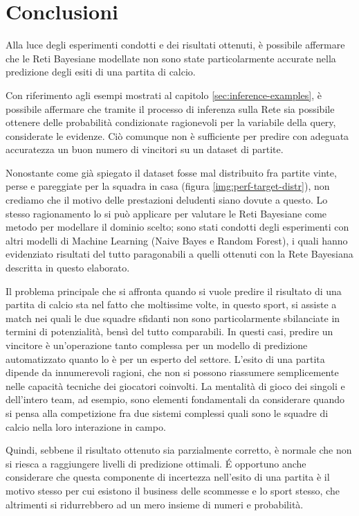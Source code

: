 \documentclass[hidelinks, 12pt]{article}
\begin{document}
\clearpage



\section{Conclusioni}

Alla luce degli esperimenti condotti e dei risultati ottenuti, è possibile affermare che le Reti Bayesiane modellate non sono state particolarmente accurate nella predizione degli esiti di una partita di calcio.

Con riferimento agli esempi mostrati al capitolo \ref{sec:inference-examples}, è possibile affermare che tramite il processo di inferenza sulla Rete sia possibile ottenere delle probabilità condizionate ragionevoli per la variabile della query, considerate le evidenze. Ciò comunque non è sufficiente per predire con adeguata accuratezza un buon numero di vincitori su un dataset di partite.

Nonostante come già spiegato il dataset fosse mal distribuito fra partite vinte, perse e pareggiate per la squadra in casa (figura \ref{img:perf-target-distr}), non crediamo che il motivo delle prestazioni deludenti siano dovute a questo. Lo stesso ragionamento lo si può applicare per valutare le Reti Bayesiane come metodo per modellare il dominio scelto; sono stati condotti degli esperimenti con altri modelli di Machine Learning (Naive Bayes e Random Forest), i quali hanno evidenziato risultati del tutto paragonabili a quelli ottenuti con la Rete Bayesiana descritta in questo elaborato.

Il problema principale che si affronta quando si vuole predire il risultato di una partita di calcio sta nel fatto che moltissime volte, in questo sport, si assiste a match nei quali le due squadre sfidanti non sono particolarmente sbilanciate in termini di potenzialità, bensì del tutto comparabili. In questi casi, predire un vincitore è un'operazione tanto complessa per un modello di predizione automatizzato quanto lo è per un esperto del settore. L'esito di una partita dipende da innumerevoli ragioni, che non si possono riassumere semplicemente nelle capacità tecniche dei giocatori coinvolti. La mentalità di gioco dei singoli e dell'intero team, ad esempio, sono elementi fondamentali da considerare quando si pensa alla competizione fra due sistemi complessi quali sono le squadre di calcio nella loro interazione in campo.

Quindi, sebbene il risultato ottenuto sia parzialmente corretto, è normale che non si riesca a raggiungere livelli di predizione ottimali. É opportuno anche considerare che questa componente di incertezza nell'esito di una partita è il motivo stesso per cui esistono il business delle scommesse e lo sport stesso, che altrimenti si ridurrebbero ad un mero insieme di numeri e probabilità.




\newpage


	
\end{document}
